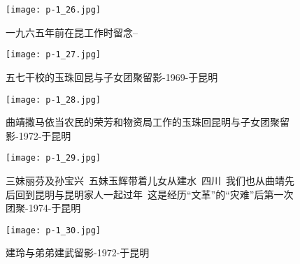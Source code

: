 \clearpage


\begin{figure}
    \begin{center}
        \texttt{[image: p-1\_26.jpg]}
        \begin{shaded}
            \caption{一九六五年前在昆工作时留念--}
        \end{shaded}
    \end{center}
\end{figure}

\clearpage


\begin{figure}
    \begin{center}
        \texttt{[image: p-1\_27.jpg]}
        \begin{shaded}
            \caption{五七干校的玉珠回昆与子女团聚留影-1969-于昆明}
        \end{shaded}
    \end{center}
\end{figure}

\clearpage


\begin{figure}
    \begin{center}
        \texttt{[image: p-1\_28.jpg]}
        \begin{shaded}
            \caption{曲靖撒马依当农民的荣芳和物资局工作的玉珠回昆明与子女团聚留影-1972-于昆明}
        \end{shaded}
    \end{center}
\end{figure}

\clearpage


\begin{figure}
    \begin{center}
        \texttt{[image: p-1\_29.jpg]}
        \begin{shaded}
            \caption{三妹丽芬及孙宝兴~五妹玉辉带着儿女从建水~四川~我们也从曲靖先后回到昆明与昆明家人一起过年~这是经历“文革”的“灾难”后第一次团聚-1974-于昆明}
        \end{shaded}
    \end{center}
\end{figure}

\clearpage


\begin{figure}
    \begin{center}
        \texttt{[image: p-1\_30.jpg]}
        \begin{shaded}
            \caption{建玲与弟弟建武留影-1972-于昆明}
        \end{shaded}
    \end{center}
\end{figure}

